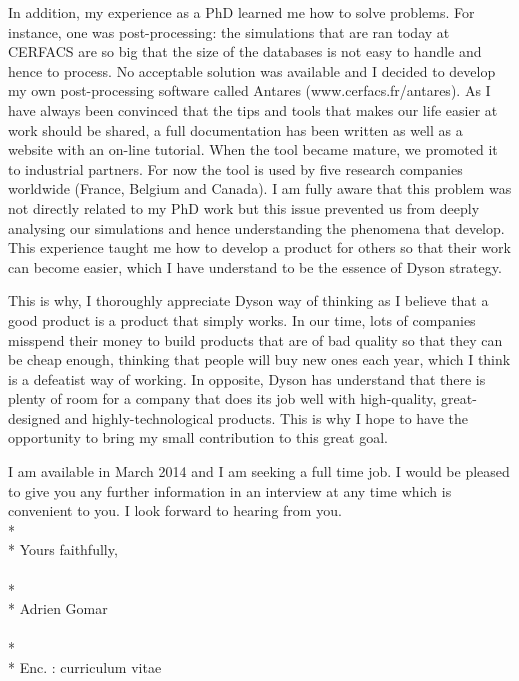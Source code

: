 \documentclass[11pt]{article}
\begin{document}
\noindent
In addition, my experience as a PhD learned me how to solve problems. 
For instance, one was 
post-processing: the simulations that are ran today at CERFACS are so big
that the size of the databases is not easy to handle and hence to process. 
No acceptable solution was available and I decided to develop my own post-processing software 
called Antares (www.cerfacs.fr/antares). As I have always been convinced that
the tips and tools that makes our life easier at work should be shared, 
a full documentation has been written as well as a website with an on-line tutorial.
When the tool became mature, we promoted it to industrial partners. For now
the tool is used by five research companies worldwide (France, Belgium and Canada).
I am fully aware that this problem was not directly related to my PhD work but
this issue prevented us from deeply analysing our simulations and hence understanding
the phenomena that develop. This experience taught me how
to develop a product for others so that their work can become easier, which I have
understand to be the essence of Dyson strategy.
\newline

\noindent
This is why, I thoroughly appreciate Dyson way of thinking as I believe that
a good product is a product that simply works. In our time, lots
of companies misspend their money to build products that are of 
bad quality so that they can be cheap enough, 
thinking that people will buy new ones each year, which I
think is a defeatist way of working. 
In opposite, Dyson has understand that there is plenty of room
for a company that does its job well with high-quality, great-designed and 
highly-technological products. This is why I hope to have
the opportunity to bring my small contribution to this great goal.
\newline

\noindent
I am available in March 2014 and I am seeking 
a full time job. I would be pleased to give you
any further information in an interview at any time which is convenient to you.
I look forward to hearing from you.
\\*
\\*
Yours faithfully, \\
\\*
\\*
Adrien Gomar \\
\\*
\\*
Enc. : curriculum vitae
\end{document}
